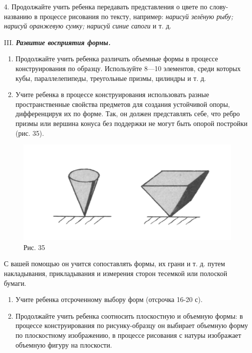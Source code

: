 \documentclass[a5paper]{book}
\renewcommand{\emph}[1]{\textit{#1}}
\begin{document}
4. Продолжайте учить ребенка передавать представления о цвете по
слову-названию в процессе рисования по тексту, например: \emph{нарисуй
зелёную рыбу; нарисуй оранжевую сумку; нарисуй синие сапоги} и т. д.

III. \emph{\textbf{Развитие восприятия формы.}}


\begin{enumerate}
\def\labelenumi{\arabic{enumi}.}
\item
  
  Продолжайте учить ребенка различать объемные формы в процессе
  конструирования по образцу. Используйте 8---10 элементов, среди
  которых кубы, параллелепипеды, треугольные призмы, цилиндры и т. д.
  
\item
  
  Учите ребенка в процессе конструирования использовать разные
  пространственные свойства предметов для создания устойчивой опоры,
  дифференцируя их по форме. Так, он должен представлять себе, что ребро
  призмы или вершина конуса без поддержки не могут быть опорой постройки
  (рис. 35).
  
\end{enumerate}


\begin{figure}
\centering
\includegraphics[width=\linewidth]{media/media/image32.png}
\caption*{Рис. 35}
\end{figure}

С вашей помощью он учится сопоставлять формы, их грани и т. д. путем
накладывания, прикладывания и измерения сторон тесемкой или полоской
бумаги.


\begin{enumerate}
\def\labelenumi{\arabic{enumi}.}
\setcounter{enumi}{2}
\item
  
  Учите ребенка отсроченному выбору форм (отсрочка 16-20 с).
  
\item
  
  Продолжайте учить ребенка соотносить плоскостную и объемную формы: в
  процессе конструирования по рисунку-образцу он выбирает объемную форму
  по плоскостному изображению, в процессе рисования с натуры изображает
  объемную фигуру на плоскости.
  
\end{enumerate}
\end{document}
